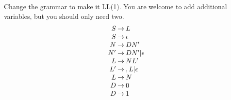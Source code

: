 \documentclass{article}
\begin{document}
Change the grammar to make it LL(1).  You are welcome to add additional
variables, but you should only need two.  
\answer
\[
  \begin{array}{r@{\:\rightarrow\:}l}
    S & L        \\
    S & \epsilon \\
    N & DN'       \\
    N' & DN'|\epsilon    \\
    L & NL'      \\
    L'& ,L|\epsilon    \\
    L & N        \\
    D & 0        \\
    D & 1        \\  
  \end{array}
\]
\end{document}
